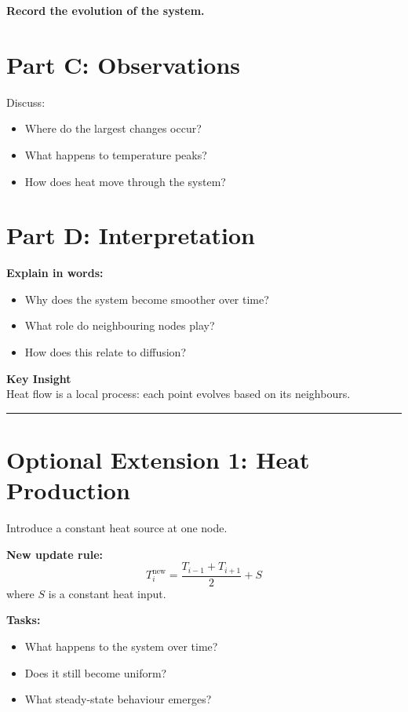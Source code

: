 \documentclass[11pt,a4paper]{article}
\begin{document}
\textbf{Record the evolution of the system.}

\section*{Part C: Observations}

Discuss:
\begin{itemize}
    \item Where do the largest changes occur?
    \item What happens to temperature peaks?
    \item How does heat move through the system?
\end{itemize}

\section*{Part D: Interpretation}

\textbf{Explain in words:}
\begin{itemize}
    \item Why does the system become smoother over time?
    \item What role do neighbouring nodes play?
    \item How does this relate to diffusion?
\end{itemize}

\bigskip

\textbf{Key Insight} \\
Heat flow is a local process: each point evolves based on its neighbours.

\bigskip
\hrule
\bigskip

\section*{Optional Extension 1: Heat Production}

Introduce a constant heat source at one node.

\textbf{New update rule:}
\begin{equation}
T_i^{\text{new}} = \frac{T_{i-1} + T_{i+1}}{2} + S
\end{equation}
where $S$ is a constant heat input.

\textbf{Tasks:}
\begin{itemize}
    \item What happens to the system over time?
    \item Does it still become uniform?
    \item What steady-state behaviour emerges?
\end{itemize}
\end{document}
